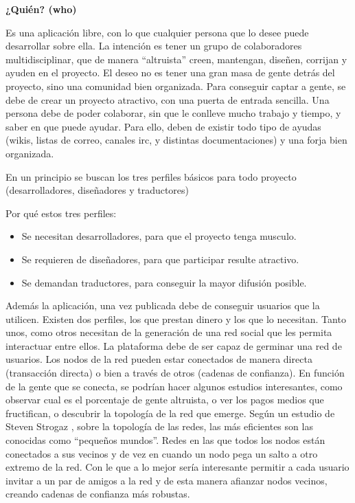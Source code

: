 \documentclass[a4paper, 12pt]{book}
\begin{document}
\textbf{¿Quién? (who)}

Es una aplicación libre, con lo que cualquier persona que lo desee puede 
desarrollar sobre ella. La intención es tener un grupo de colaboradores 
multidisciplinar, que de manera ``altruista'' creen, mantengan, diseñen, 
corrijan y ayuden en el proyecto. El deseo no es tener una gran masa de gente 
detrás del proyecto, sino una comunidad bien organizada. Para conseguir captar 
a gente, se debe de crear un proyecto atractivo, con una puerta de entrada 
sencilla. Una persona debe de poder colaborar, sin que le conlleve mucho 
trabajo y tiempo, y saber en que puede ayudar. Para ello, deben de existir todo 
tipo de ayudas (wikis, listas de correo, canales irc, y distintas 
documentaciones) y una forja bien organizada.

En un principio se buscan los tres perfiles básicos para todo proyecto 
(desarrolladores, diseñadores y traductores)

Por qué estos tres perfiles:
\begin{itemize}
    \item Se necesitan desarrolladores,  para que el proyecto tenga musculo.
    \item Se requieren de diseñadores, para que participar resulte atractivo.
    \item Se demandan traductores, para conseguir la mayor difusión posible.
\end{itemize}

Además la aplicación, una vez publicada debe de conseguir usuarios que la 
utilicen. Existen dos perfiles, los que prestan dinero y los que lo necesitan. 
Tanto unos, como otros necesitan de la generación de una red social que les 
permita interactuar entre ellos. La plataforma debe de ser capaz de germinar 
una red de usuarios. Los nodos de la red pueden estar conectados de manera 
directa (transacción directa) o bien a través de otros (cadenas de confianza). 
En función de la gente que se conecta, se podrían hacer algunos estudios 
interesantes, como observar cual es el porcentaje de gente altruista, o ver los 
pagos medios que fructifican, o descubrir la topología de la red que emerge. 
Según un estudio de Steven Strogaz \cite{Steven Strogaz}, sobre la topología 
de las redes, las más eficientes son las conocidas como ``pequeños mundos''. 
Redes en las que todos los nodos están conectados a sus vecinos y de vez en 
cuando un nodo pega un salto a otro extremo de la red. Con le que a lo mejor 
sería interesante permitir a cada usuario invitar a un par de amigos a la red 
y de esta manera afianzar nodos vecinos, creando cadenas de confianza más 
robustas.
\end{document}
